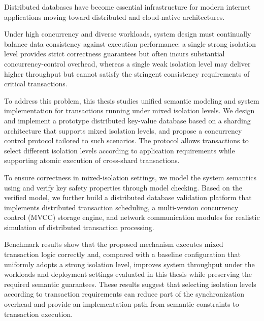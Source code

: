 \documentclass[
    type = master,
    degree = professional,
    twoside,
    fontset = win,
    decl-page = true
  ]{njuthesis}
\begin{document}
\begin{abstract*}
      Distributed databases have become essential infrastructure for modern internet applications moving toward distributed and cloud-native architectures.

      Under high concurrency and diverse workloads, system design must continually balance data consistency against execution performance:
      a single strong isolation level provides strict correctness guarantees but often incurs substantial concurrency-control overhead,
      whereas a single weak isolation level may deliver higher throughput but cannot satisfy the stringent consistency requirements of critical transactions.

      To address this problem, this thesis studies unified semantic modeling and system implementation for transactions running under mixed isolation levels.
      We design and implement a prototype distributed key-value database based on a sharding architecture that supports mixed isolation levels, and propose a concurrency control protocol tailored to such scenarios.
      The protocol allows transactions to select different isolation levels according to application requirements while supporting atomic execution of cross-shard transactions.

      To ensure correctness in mixed-isolation settings, we model the system semantics using \TLAPlus and verify key safety properties through model checking.
      Based on the verified model, we further build a distributed database validation platform that implements distributed transaction scheduling, a multi-version concurrency control (MVCC) storage engine, and network communication modules for realistic simulation of distributed transaction processing.

      Benchmark results show that the proposed mechanism executes mixed transaction logic correctly and, compared with a baseline configuration that uniformly adopts a strong isolation level, improves system throughput under the workloads and deployment settings evaluated in this thesis while preserving the required semantic guarantees.
      These results suggest that selecting isolation levels according to transaction requirements can reduce part of the synchronization overhead and provide an implementation path from semantic constraints to transaction execution.
\end{abstract*}

\tableofcontents
\listoffigures
\listoftables

\mainmatter
\end{document}
